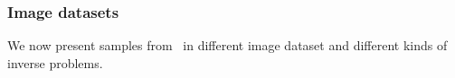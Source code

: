 
\subsubsection{Image datasets}
We now present samples from \algo\ in different image dataset and different kinds of inverse problems.
